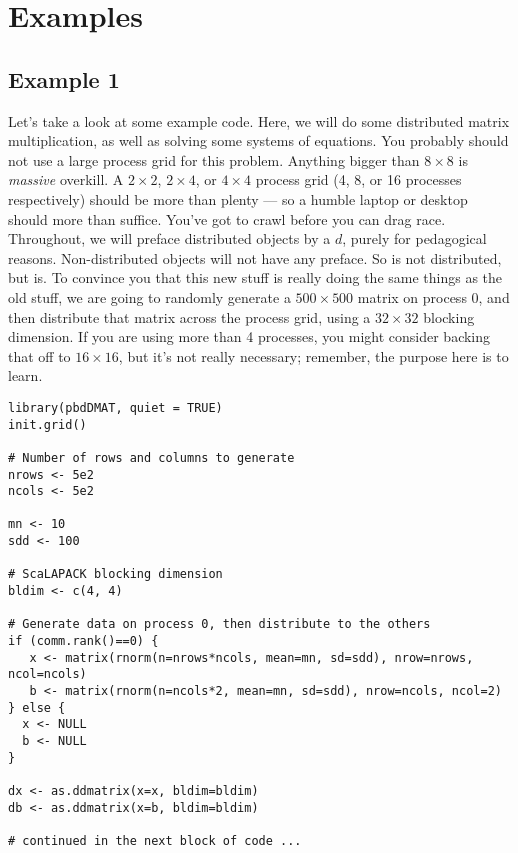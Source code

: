 \section[]{Examples}\label{sec:eg1}






\subsection[]{Example 1}

Let's take a look at some example code.  Here, we will do some distributed matrix multiplication, as well as solving some systems of equations.  You probably should not use a large process grid for this problem.  Anything bigger than $8\times 8$ is \emph{massive} overkill.  A $2\times 2$, $2\times 4$, or $4\times 4$ process grid (4, 8, or 16 processes respectively) should be more than plenty --- so a humble laptop or desktop should more than suffice.  You've got to crawl before you can drag race.
\np
Throughout, we will preface distributed objects by a $d$, purely for pedagogical reasons.  Non-distributed objects will not have any preface.  So  is not distributed, but  is.
\np
To convince you that this new stuff is really doing the same things as the old stuff, we are going to randomly generate a $500\times 500$ matrix on process 0, and then distribute that matrix across the process grid, using a $32\times 32$ blocking dimension.  If you are using more than 4 processes, you might consider backing that off to $16\times 16$, but it's not really necessary; remember, the purpose here is to learn.

\begin{lstlisting}[language=rr,title=Generating Test Data]
library(pbdDMAT, quiet = TRUE)
init.grid() 

# Number of rows and columns to generate
nrows <- 5e2
ncols <- 5e2

mn <- 10
sdd <- 100

# ScaLAPACK blocking dimension
bldim <- c(4, 4)

# Generate data on process 0, then distribute to the others
if (comm.rank()==0) {
   x <- matrix(rnorm(n=nrows*ncols, mean=mn, sd=sdd), nrow=nrows, ncol=ncols)
   b <- matrix(rnorm(n=ncols*2, mean=mn, sd=sdd), nrow=ncols, ncol=2)
} else {
  x <- NULL  
  b <- NULL
}

dx <- as.ddmatrix(x=x, bldim=bldim)
db <- as.ddmatrix(x=b, bldim=bldim)

# continued in the next block of code ...
\end{lstlisting}

